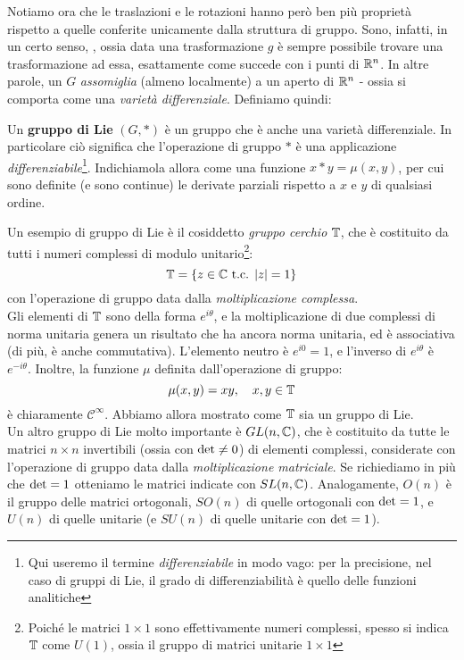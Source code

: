 \documentclass[../../FisicaTeorica.tex]{subfiles}
\begin{document}
Notiamo ora che le traslazioni e le rotazioni hanno però ben più proprietà rispetto a quelle conferite unicamente dalla struttura di gruppo. Sono, infatti, in un certo senso, , ossia data una trasformazione $g$ è sempre possibile trovare una trasformazione  ad essa, esattamente come succede con i punti di $\mathbb{R}^n$. In altre parole, un $G$  \textit{assomiglia} (almeno localmente) a un aperto di $\mathbb{R}^n$ - ossia si comporta come una \textit{varietà differenziale}. Definiamo quindi:

\begin{dfn}
Un \textbf{gruppo di Lie} $(G,*)$ è un gruppo che è anche una varietà differenziale. In particolare ciò significa che l'operazione di gruppo $*$ è una applicazione \textit{differenziabile}\footnote{Qui useremo il termine \textit{differenziabile} in modo vago: per la precisione, nel caso di gruppi di Lie, il grado di differenziabilità è quello delle funzioni analitiche}. Indichiamola allora come una funzione $x * y = \mu(x,y)$, per cui sono definite (e sono continue) le derivate parziali rispetto a $x$ e $y$ di qualsiasi ordine.
\end{dfn}

Un esempio di gruppo di Lie è il cosiddetto \textit{gruppo cerchio} $\mathbb{T}$, che è costituito da tutti i numeri complessi di modulo unitario\footnote{Poiché le matrici $1\times 1$ sono effettivamente numeri complessi, spesso si indica $\mathbb{T}$ come $U(1)$, ossia il gruppo di matrici unitarie $1 \times 1$}:
\[
\mathbb{T}=\{z \in \mathbb{C} \text{ t.c. } |z| = 1\}
\]
con l'operazione di gruppo data dalla \textit{moltiplicazione complessa}.\\
Gli elementi di $\mathbb{T}$ sono della forma $e^{i\theta}$, e la moltiplicazione di due complessi di norma unitaria genera un risultato che ha ancora norma unitaria, ed  è associativa (di più, è anche commutativa). L'elemento neutro è $e^{i0} = 1$, e l'inverso di $e^{i\theta}$ è $e^{-i\theta}$. Inoltre, la funzione $\mu$ definita dall'operazione di gruppo:
\[
\mu(x,y)=x y, \quad x,y \in \mathbb{T}
\]
è chiaramente $\mathcal{C}^\infty$. Abbiamo allora mostrato come $\mathbb{T}$ sia un gruppo di Lie.\\

Un altro gruppo di Lie molto importante è $GL(n,\mathbb{C})$, che è costituito da tutte le matrici $n\times n$ invertibili (ossia con $\operatorname{det}\neq 0$) di elementi complessi, considerate con l'operazione di gruppo data dalla \textit{moltiplicazione matriciale}. Se richiediamo in più che $\operatorname{det}=1$ otteniamo le matrici  indicate con $SL(n,\mathbb{C})$. Analogamente, $O(n)$ è il gruppo delle matrici ortogonali, $SO(n)$ di quelle ortogonali con $\operatorname{det}=1$, e $U(n)$ di quelle unitarie (e $SU(n)$ di quelle unitarie con $\operatorname{det}=1$).\\
\end{document}
